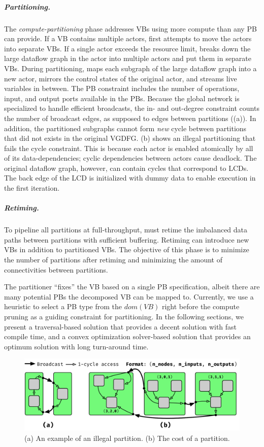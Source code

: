 \subparagraph{Partitioning.}
The {\em compute-partitioning} phase addresses VBs using more compute than any PB can provide. 
If a VB contains multiple actors, \name{} first attempts to move the actors into separate VBs.
If a single actor exceeds the resource limit, \name{} breaks down the large dataflow graph in the actor into multiple actors and put them in separate VBs.
During partitioning, \name{} maps each subgraph of the large dataflow graph into a new actor, mirrors the control states of the original actor, and streams live variables in between.
The PB constraint includes the number of operations, input, and output ports available in the PBs.
Because the global network is specialized to handle efficient broadcasts, the in- and out-degree constraint counts the number of broadcast edges, as supposed to edges between partitions ((a)).
In addition, the partitioned subgraphs cannot form {\em new} cycle between partitions that did not exists in the original VGDFG. 
 (b) shows an illegal partitioning that fails the cycle constraint.
This is because each actor is enabled atomically by all of its data-dependencies; cyclic dependencies between actors cause deadlock.
The original dataflow graph, however, can contain cycles that correspond to LCDs.
The back edge of the LCD is initialized with dummy data to enable execution in the first iteration.

\subparagraph{Retiming.}
To pipeline all partitions at full-throughput, \name{} must retime the imbalanced data paths between partitions with sufficient buffering. 
Retiming can introduce new VBs in addition to partitioned VBs.
The objective of this phase is to minimize the number of partitions after retiming and minimizing the amount of connectivities between partitions.

The partitioner ``fixes'' the VB based on a single PB specification, albeit there are many potential PBs the decomposed VB can be mapped to.
Currently, we use a heuristic to select a PB type from the $dom(VB)$ right before the compute pruning as a guiding constraint for partitioning.
In the following sections, we present a traversal-based solution that provides a decent solution with fast compile time, and a convex optimization solver-based solution that provides an optimum solution with long turn-around time.

\begin{figure}
  \centering
  \includegraphics[width=1\columnwidth]{figures/partition_example.pdf}
  \caption{(a) An example of an illegal partition. (b) The cost of a partition.}
  \label{fig:parteg}
\end{figure}

